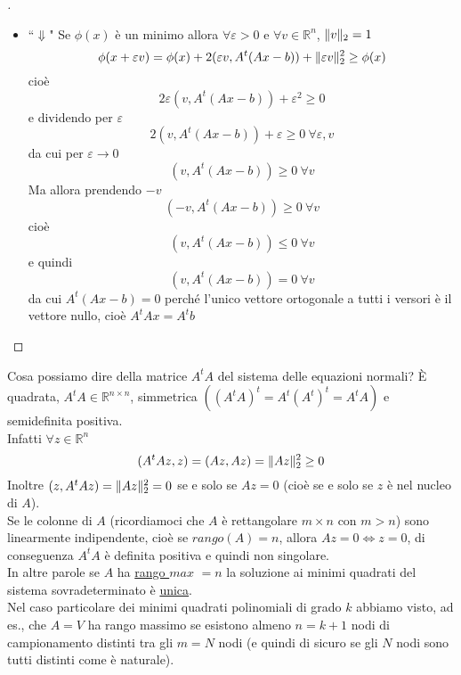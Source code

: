\documentclass[12pt,a4paper]{article}
\DeclarePairedDelimiter{\norma}{\lVert}{\rVert}
\begin{document}
\begin{proof}[\unskip\nopunct]
\begin{itemize}
\item ``$\Downarrow$" Se $\phi(x)$ è un minimo allora $\forall \varepsilon >0$ e $\forall v \in \mathbb{R}^n$, $\norma{v}_2=1$
\begin{equation*}
    \phi(x+\varepsilon v)=\phi(x) + 2(\varepsilon v, A^t(Ax-b)) + \norma{\varepsilon v}_2^2 \geq \phi(x)
\end{equation*}
cioè
\begin{equation*}
    2\varepsilon(v,A^t(Ax-b))+\varepsilon^2 \geq 0
\end{equation*}
e dividendo per $\varepsilon$
\begin{equation*}
    2(v,A^t(Ax-b))+\varepsilon \geq 0 \ \forall \varepsilon,v
\end{equation*}
da cui per $\varepsilon \to 0$
\begin{equation*}
    (v, A^t(Ax-b)) \geq 0 \ \forall v
\end{equation*}
Ma allora prendendo $-v$
\begin{equation*}
    (-v, A^t(Ax-b)) \geq 0 \ \forall v
\end{equation*}
cioè
\begin{equation*}
    (v, A^t(Ax-b)) \leq 0 \ \forall v
\end{equation*}
e quindi
\begin{equation*}
    (v, A^t(Ax-b)) = 0 \ \forall v
\end{equation*}
da cui $A^t(Ax-b)=0$ perché l'unico vettore ortogonale a tutti i versori è il vettore nullo, cioè $A^tAx=A^tb$
\end{itemize}
\end{proof}
\vspace{0.2cm}
Cosa possiamo dire della matrice $A^tA$ del sistema delle equazioni normali?
È quadrata, $A^tA \in \mathbb{R}^{n\times n}$, simmetrica $((A^tA)^t = A^t(A^t)^t = A^tA)$ e semidefinita positiva. \\
Infatti $\forall z \in \mathbb{R}^n$
\begin{equation*}
    (A^tAz,z) = (Az,Az)=\norma{Az}_2^2 \geq 0
\end{equation*}
Inoltre $(z,A^tAz)=\norma{Az}_2^2=0$ se e solo se $Az=0$ (cioè se e solo se $z$ è nel nucleo di $A$). \\
Se le colonne di $A$ (ricordiamoci che $A$ è rettangolare $m\times n$ con $m>n$) sono linearmente indipendente, cioè se $rango(A)=n$, allora $Az=0 \Leftrightarrow z = 0$, di conseguenza $A^tA$ è definita positiva e quindi non singolare. \\
In altre parole se $A$ ha \uline{rango $max$} $=n$ la soluzione ai minimi quadrati del sistema sovradeterminato è \uline{unica}. \\
Nel caso particolare dei minimi quadrati polinomiali di grado $k$ abbiamo visto, ad es., che $A=V$ ha rango massimo se esistono almeno $n=k+1$ nodi di campionamento distinti tra gli $m=N$ nodi (e quindi di sicuro se gli $N$ nodi sono tutti distinti come è naturale).
\end{document}
